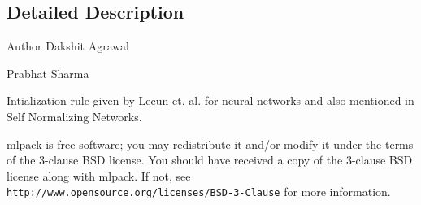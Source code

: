 \subsection{Detailed Description}
\begin{DoxyAuthor}{Author}
Dakshit Agrawal 

Prabhat Sharma
\end{DoxyAuthor}
Intialization rule given by Lecun et. al. for neural networks and also mentioned in Self Normalizing Networks.

mlpack is free software; you may redistribute it and/or modify it under the terms of the 3-\/clause B\+SD license. You should have received a copy of the 3-\/clause B\+SD license along with mlpack. If not, see {\tt http\+://www.\+opensource.\+org/licenses/\+B\+S\+D-\/3-\/\+Clause} for more information. 